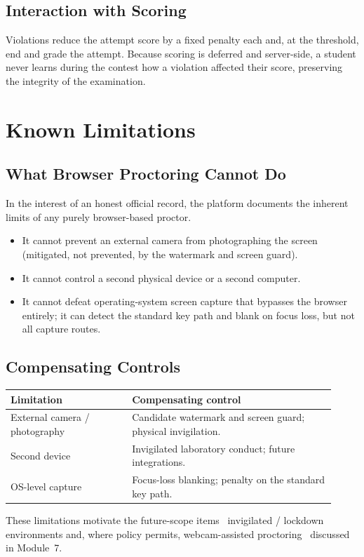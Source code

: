 \documentclass[12pt,a4paper,oneside]{report}
\begin{document}
\section{Interaction with Scoring}
Violations reduce the attempt score by a fixed penalty each and, at the
threshold, end and grade the attempt. Because scoring is deferred and
server-side, a student never learns during the contest how a violation affected
their score, preserving the integrity of the examination.

\chapter{Known Limitations}
\section{What Browser Proctoring Cannot Do}
In the interest of an honest official record, the platform documents the inherent
limits of any purely browser-based proctor.
\begin{itemize}[leftmargin=1.5em]
  \item It cannot prevent an external camera from photographing the screen
        (mitigated, not prevented, by the watermark and screen guard).
  \item It cannot control a second physical device or a second computer.
  \item It cannot defeat operating-system screen capture that bypasses the
        browser entirely; it can detect the standard key path and blank on focus
        loss, but not all capture routes.
\end{itemize}

\section{Compensating Controls}
\begin{longtable}{@{}p{0.34\linewidth} p{0.58\linewidth}@{}}
\toprule
\textbf{Limitation} & \textbf{Compensating control}\\
\midrule
\endhead
External camera / photography & Candidate watermark and screen guard; physical invigilation.\\
Second device & Invigilated laboratory conduct; future integrations.\\
OS-level capture & Focus-loss blanking; penalty on the standard key path.\\
\bottomrule
\end{longtable}
These limitations motivate the future-scope items \textemdash\ invigilated /
lockdown environments and, where policy permits, webcam-assisted proctoring
\textemdash\ discussed in Module~7.
\end{document}
